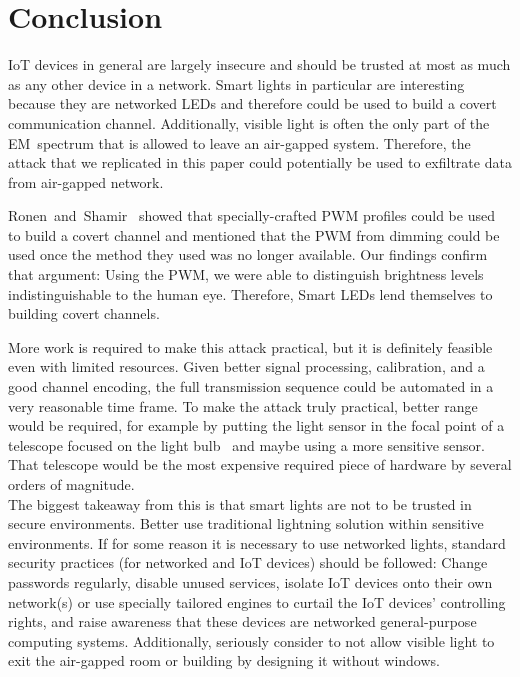 \section{Conclusion} %
\label{sec:conclusion}

IoT devices in general are largely insecure and should be trusted at most as much as any other device in a network.
Smart lights in particular are interesting because they are networked LEDs and therefore could be used to build a covert communication channel.
Additionally, visible light is often the only part of the EM~spectrum that is allowed to leave an air-gapped system.
Therefore, the attack that we replicated in this paper could potentially be used to exfiltrate data from air-gapped network.

Ronen~and~Shamir~\cite{Ronen:2016:EFAIDCSL} showed that specially-crafted PWM profiles could be used to build a covert channel and mentioned that the PWM from dimming could be used once the method they used was no longer available.
Our findings confirm that argument: Using the PWM, we were able to distinguish brightness levels indistinguishable to the human eye.
Therefore, Smart LEDs lend themselves to building covert channels.

More work is required to make this attack practical, but it is definitely feasible even with limited resources.
Given better signal processing, calibration, and a good channel encoding, the full transmission sequence could be automated in a very reasonable time frame. 
To make the attack truly practical, better range would be required, for example by putting the light sensor in the focal point of a telescope focused on the light bulb~\cite{Ronen:2016:EFAIDCSL} and maybe using a more sensitive sensor.
That telescope would be the most expensive required piece of hardware by several orders of magnitude. \\

The biggest takeaway from this is that smart lights are not to be trusted in secure environments. 
Better use traditional lightning solution within sensitive environments.
If for some reason it is necessary to use networked lights, standard security practices (for networked and IoT devices) should be followed:
Change passwords regularly, disable unused services, isolate IoT devices onto their own network(s) or use specially tailored engines to curtail the IoT devices' controlling rights, and raise awareness that these devices are networked general-purpose computing systems.
Additionally, seriously consider to not allow visible light to exit the air-gapped room or building by designing it without windows.

